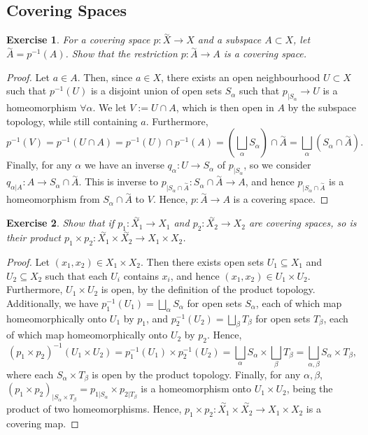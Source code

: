 \documentclass{article}
\newtheorem{exercise}{Exercise}[subsection]
\begin{document}
\subsection{Covering Spaces}
\begin{exercise}
For a covering space $p:\overset{\sim}{X}\to X$ and a subspace $A\subset X$, let $\overset{\sim}{A}=p^{-1}(A)$. Show that the restriction $p:\overset{\sim}{A}\to A$ is a covering space.
\end{exercise}
\begin{proof}
Let $a\in A$. Then, since $a\in X$, there exists an open neighbourhood $U\subset X$ such that $p^{-1}(U)$ is a disjoint union of open sets $S_\alpha$ such that $p_{|S_\alpha}\to U$ is a homeomorphism $\forall\alpha$. We let $V:=U\cap A$, which is then open in $A$ by the subspace topology, while still containing $a$. Furthermore, \[p^{-1}(V)=p^{-1}(U\cap A)=p^{-1}(U)\cap p^{-1}(A)=\left(\bigsqcup_\alpha S_\alpha\right)\cap \overset{\sim}{A}=\bigsqcup_\alpha (S_\alpha\cap \overset{\sim}{A}).\]Finally, for any $\alpha$ we have an inverse $q_\alpha:U\to S_\alpha$ of $p_{|S_\alpha}$, so we consider $q_{\alpha|A}:A\to S_\alpha\cap\overset{\sim}{A}$. This is inverse to $p_{|S_\alpha\cap\overset{\sim}{A}}:S_\alpha\cap\overset{\sim}{A}\to A$, and hence $p_{|S_\alpha\cap\overset{\sim}{A}}$ is a homeomorphism from $S_\alpha\cap\overset{\sim}{A}$ to $V$. Hence, $p:\overset{\sim}{A}\to A$ is a covering space.
\end{proof}
\begin{exercise}
Show that if $p_1:\overset{\sim}{X_1}\to X_1$ and $p_2:\overset{\sim}{X_2}\to X_2$ are covering spaces, so is their product $p_1\times p_2:\overset{\sim}{X_1}\times\overset{\sim}{X_2}\to X_1\times X_2$.
\end{exercise}
\begin{proof}
Let $(x_1,x_2)\in X_1\times X_2$. Then there exists open sets $U_1\subseteq X_1$ and $U_2\subseteq X_2$ such that each $U_i$ contains $x_i$, and hence $(x_1,x_2)\in U_1\times U_2$. Furthermore, $U_1\times U_2$ is open, by the definition of the product topology. Additionally, we have $p_1^{-1}(U_1)=\bigsqcup_\alpha S_\alpha$ for open sets $S_\alpha$, each of which map homeomorphically onto $U_1$ by $p_1$, and $p_2^{-1}(U_2)=\bigsqcup_\beta T_\beta$ for open sets $T_\beta$, each of which map homeomorphically onto $U_2$ by $p_2$. Hence, \[(p_1\times p_2)^{-1}(U_1\times U_2)=p_1^{-1}(U_1)\times p_2^{-1}(U_2)=\bigsqcup_\alpha S_\alpha\times\bigsqcup_\beta T_\beta=\bigsqcup_{\alpha,\beta}S_\alpha\times T_\beta,\] where each $S_\alpha\times T_\beta$ is open by the product topology. Finally, for any $\alpha,\beta$, $(p_1\times p_2)_{|S_\alpha\times T_\beta}=p_{1|S_\alpha}\times p_{2|T_\beta}$ is a homeomorphism onto $U_1\times U_2$, being the product of two homeomorphisms. Hence, $p_1\times p_2:\overset{\sim}{X_1}\times\overset{\sim}{X_2}\to X_1\times X_2$ is a covering map.
\end{proof}
\end{document}
